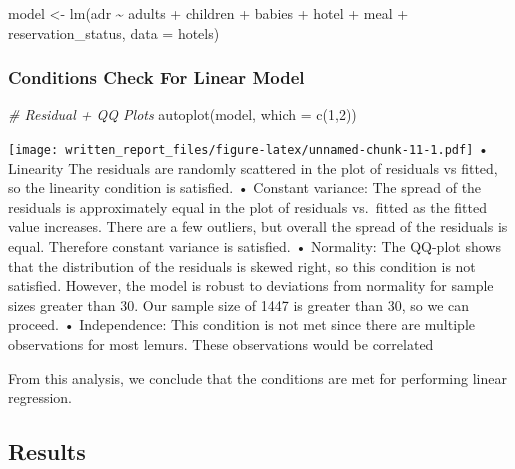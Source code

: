 \documentclass[
]{article}
\newenvironment{Shaded}{\begin{snugshade}}{\end{snugshade}}
\newcommand{\AttributeTok}[1]{\textcolor[rgb]{0.77,0.63,0.00}{#1}}
\newcommand{\CommentTok}[1]{\textcolor[rgb]{0.56,0.35,0.01}{\textit{#1}}}
\newcommand{\DecValTok}[1]{\textcolor[rgb]{0.00,0.00,0.81}{#1}}
\newcommand{\FunctionTok}[1]{\textcolor[rgb]{0.00,0.00,0.00}{#1}}
\newcommand{\NormalTok}[1]{#1}
\newcommand{\OtherTok}[1]{\textcolor[rgb]{0.56,0.35,0.01}{#1}}
\newcommand{\SpecialCharTok}[1]{\textcolor[rgb]{0.00,0.00,0.00}{#1}}
\begin{document}
\begin{Shaded}
\begin{Highlighting}[]
\NormalTok{model }\OtherTok{\textless{}{-}} \FunctionTok{lm}\NormalTok{(adr }\SpecialCharTok{\textasciitilde{}}\NormalTok{ adults }\SpecialCharTok{+}\NormalTok{ children }\SpecialCharTok{+}\NormalTok{ babies }\SpecialCharTok{+}\NormalTok{ hotel }\SpecialCharTok{+}\NormalTok{ meal }\SpecialCharTok{+}\NormalTok{ reservation\_status, }\AttributeTok{data =}\NormalTok{ hotels)}
\end{Highlighting}
\end{Shaded}

\hypertarget{conditions-check-for-linear-model}{%
\subsubsection{Conditions Check For Linear
Model}\label{conditions-check-for-linear-model}}

\begin{Shaded}
\begin{Highlighting}[]
\CommentTok{\# Residual + QQ Plots}
\FunctionTok{autoplot}\NormalTok{(model, }\AttributeTok{which =} \FunctionTok{c}\NormalTok{(}\DecValTok{1}\NormalTok{,}\DecValTok{2}\NormalTok{))}
\end{Highlighting}
\end{Shaded}

\texttt{[image: written\_report\_files/figure-latex/unnamed-chunk-11-1.pdf]}
• Linearity The residuals are randomly scattered in the plot of
residuals vs fitted, so the linearity condition is satisfied. • Constant
variance: The spread of the residuals is approximately equal in the plot
of residuals vs.~fitted as the fitted value increases. There are a few
outliers, but overall the spread of the residuals is equal. Therefore
constant variance is satisfied. • Normality: The QQ-plot shows that the
distribution of the residuals is skewed right, so this condition is not
satisfied. However, the model is robust to deviations from normality for
sample sizes greater than 30. Our sample size of 1447 is greater than
30, so we can proceed. • Independence: This condition is not met since
there are multiple observations for most lemurs. These observations
would be correlated

From this analysis, we conclude that the conditions are met for
performing linear regression.

\hypertarget{results}{%
\subsection{Results}\label{results}}
\end{document}

